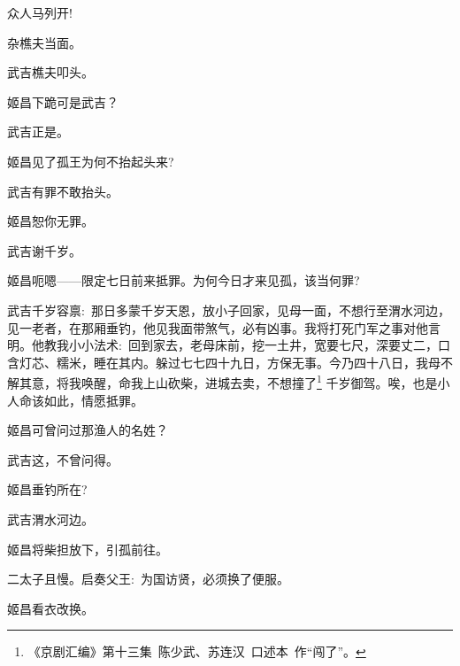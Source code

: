 {众\hspace{41pt}人马列开!

杂\hspace{41pt}樵夫当面。

武吉\hspace{30pt}樵夫叩头。

姬昌\hspace{30pt}下跪可是武吉？

武吉\hspace{30pt}正是。

姬昌\hspace{30pt}见了孤王为何不抬起头来?

武吉\hspace{30pt}有罪不敢抬头。

姬昌\hspace{30pt}恕你无罪。

武吉\hspace{30pt}谢千岁。

姬昌\hspace{30pt}呃嗯------限定七日前来抵罪。为何今日才来见孤，该当何罪?

\setlength{\hangindent}{52pt}   %
{武吉\hspace{30pt}千岁容禀:~那日多蒙千岁天恩，放小子回家，见母一面，不想行至渭水河边，见一老者，在那厢垂钓，他见我面带煞气，必有凶事。我将打死门军之事对他言明。他教我小小法术:~回到家去，老母床前，挖一土井，宽要七尺，深要丈二，口含灯芯、糯米，睡在其内。躲过七七四十九日，方保无事。今乃四十八日，我母不解其意，将我唤醒，命我上山砍柴，进城去卖，不想撞了\footnote{《京剧汇编》第十三集~陈少武、苏连汉~口述本~作``闯了''。}%
千岁御驾。唉，也是小人命该如此，情愿抵罪。}

姬昌\hspace{30pt}可曾问过那渔人的名姓？

武吉\hspace{30pt}这，不曾问得。

姬昌\hspace{30pt}垂钓所在?

武吉\hspace{30pt}渭水河边。

姬昌\hspace{30pt}将柴担放下，引孤前往。

{\akai 二}太子\hspace{20pt}且慢。启奏父王:~为国访贤，必须换了便服。

姬昌\hspace{30pt}看衣改换。

}
